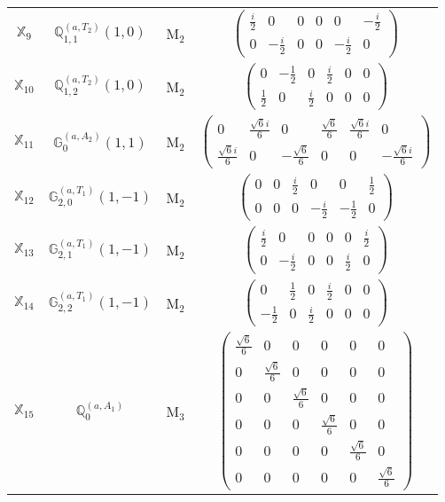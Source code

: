 \documentclass[fleqn,10pt,landscape]{article}
\begin{document}
\begin{itemize}
\begin{center}
\begin{longtable}{c|c|c|c}
$ \mathbb{X}_{9} $ & $\mathbb{Q}_{1,1}^{(a,T_{2})}(1,0)$ & M$_{2}$ & $\begin{pmatrix} \frac{i}{2} & 0 & 0 & 0 & 0 & - \frac{i}{2} \\ 0 & - \frac{i}{2} & 0 & 0 & - \frac{i}{2} & 0 \end{pmatrix}$ \\
$ \mathbb{X}_{10} $ & $\mathbb{Q}_{1,2}^{(a,T_{2})}(1,0)$ & M$_{2}$ & $\begin{pmatrix} 0 & - \frac{1}{2} & 0 & \frac{i}{2} & 0 & 0 \\ \frac{1}{2} & 0 & \frac{i}{2} & 0 & 0 & 0 \end{pmatrix}$ \\
$ \mathbb{X}_{11} $ & $\mathbb{G}_{0}^{(a,A_{2})}(1,1)$ & M$_{2}$ & $\begin{pmatrix} 0 & \frac{\sqrt{6} i}{6} & 0 & \frac{\sqrt{6}}{6} & \frac{\sqrt{6} i}{6} & 0 \\ \frac{\sqrt{6} i}{6} & 0 & - \frac{\sqrt{6}}{6} & 0 & 0 & - \frac{\sqrt{6} i}{6} \end{pmatrix}$ \\
$ \mathbb{X}_{12} $ & $\mathbb{G}_{2,0}^{(a,T_{1})}(1,-1)$ & M$_{2}$ & $\begin{pmatrix} 0 & 0 & \frac{i}{2} & 0 & 0 & \frac{1}{2} \\ 0 & 0 & 0 & - \frac{i}{2} & - \frac{1}{2} & 0 \end{pmatrix}$ \\
$ \mathbb{X}_{13} $ & $\mathbb{G}_{2,1}^{(a,T_{1})}(1,-1)$ & M$_{2}$ & $\begin{pmatrix} \frac{i}{2} & 0 & 0 & 0 & 0 & \frac{i}{2} \\ 0 & - \frac{i}{2} & 0 & 0 & \frac{i}{2} & 0 \end{pmatrix}$ \\
$ \mathbb{X}_{14} $ & $\mathbb{G}_{2,2}^{(a,T_{1})}(1,-1)$ & M$_{2}$ & $\begin{pmatrix} 0 & \frac{1}{2} & 0 & \frac{i}{2} & 0 & 0 \\ - \frac{1}{2} & 0 & \frac{i}{2} & 0 & 0 & 0 \end{pmatrix}$ \\ \hline
$ \mathbb{X}_{15} $ & $\mathbb{Q}_{0}^{(a,A_{1})}$ & M$_{3}$ & $\begin{pmatrix} \frac{\sqrt{6}}{6} & 0 & 0 & 0 & 0 & 0 \\ 0 & \frac{\sqrt{6}}{6} & 0 & 0 & 0 & 0 \\ 0 & 0 & \frac{\sqrt{6}}{6} & 0 & 0 & 0 \\ 0 & 0 & 0 & \frac{\sqrt{6}}{6} & 0 & 0 \\ 0 & 0 & 0 & 0 & \frac{\sqrt{6}}{6} & 0 \\ 0 & 0 & 0 & 0 & 0 & \frac{\sqrt{6}}{6} \end{pmatrix}$ \\

\end{longtable}
\end{center}
\end{itemize}
\end{document}

